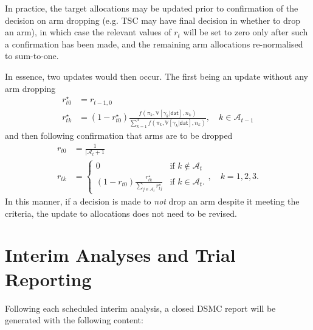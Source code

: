 \documentclass[
]{article}
\begin{document}
In practice, the target allocations may be updated prior to confirmation of the decision on arm dropping (e.g. TSC may have final decision in whether to drop an arm), in which case the relevant values of $r_t$ 
will be set to zero only after such a confirmation has been made, and the remaining arm allocations re-normalised to sum-to-one.

In essence, two updates would then occur.
The first being an update without any arm dropping
$$
\begin{aligned}
  r_{t0}^\star &= r_{t-1,0} \\
  r_{tk}^\star &= (1 - r_{t0}^\star)\frac{f(\pi_k, \mathbb V[\gamma_k|\mathsf{dat}], n_k)}{\sum_{k=1}^3 f(\pi_k, \mathbb V[\gamma_k|\mathsf{dat}], n_k)}, \quad k\in\mathcal{A}_{t-1}
\end{aligned}
$$
and then following confirmation that arms are to be dropped
$$
\begin{aligned}
  r_{t0} &= \frac{1}{|\mathcal{A}_t + 1} \\
  r_{tk} &= \begin{cases}
    0 & \text{if } k \notin \mathcal{A}_t \\
    (1 - r_{t0}) \frac{r_{tk}^\star}{\sum_{j\in\mathcal{A}_t} r_{tj}^\star} & \text{if } k \in \mathcal{A}_t.
  \end{cases}, \quad k=1,2,3.
\end{aligned}
$$
In this manner, if a decision is made to \emph{not} drop an arm despite it meeting the criteria, the update to allocations does not need to be revised.

\clearpage

\hypertarget{interim-analyses-and-trial-reporting}{%
  \section{Interim Analyses and Trial Reporting}\label{interim-analyses-and-trial-reporting}}

Following each scheduled interim analysis, a closed DSMC report will be generated with the following content:
\end{document}
